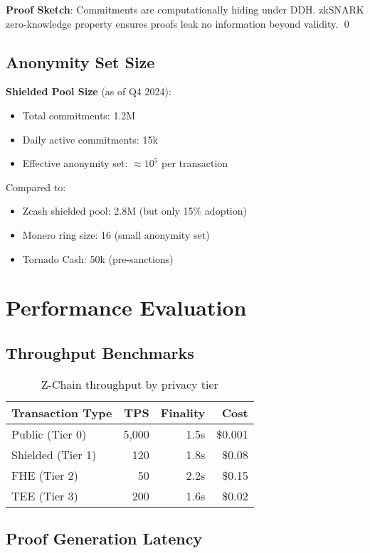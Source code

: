 \documentclass[11pt]{article}
\begin{document}
\textbf{Proof Sketch}: Commitments are computationally hiding under DDH. zkSNARK zero-knowledge property ensures proofs leak no information beyond validity. \qed

\subsection{Anonymity Set Size}

\textbf{Shielded Pool Size} (as of Q4 2024):
\begin{itemize}[leftmargin=1.1em]
  \item Total commitments: 1.2M
  \item Daily active commitments: 15k
  \item Effective anonymity set: $\approx 10^5$ per transaction
\end{itemize}

Compared to:
\begin{itemize}[leftmargin=1.1em]
  \item Zcash shielded pool: 2.8M (but only 15\% adoption)
  \item Monero ring size: 16 (small anonymity set)
  \item Tornado Cash: 50k (pre-sanctions)
\end{itemize}

\section{Performance Evaluation}

\subsection{Throughput Benchmarks}

\begin{table}[h]
\centering
\begin{tabular}{lrrr}
\toprule
Transaction Type & TPS & Finality & Cost \\
\midrule
Public (Tier 0) & 5,000 & 1.5s & \$0.001 \\
Shielded (Tier 1) & 120 & 1.8s & \$0.08 \\
FHE (Tier 2) & 50 & 2.2s & \$0.15 \\
TEE (Tier 3) & 200 & 1.6s & \$0.02 \\
\bottomrule
\end{tabular}
\caption{Z-Chain throughput by privacy tier}
\end{table}

\subsection{Proof Generation Latency}
\end{document}
